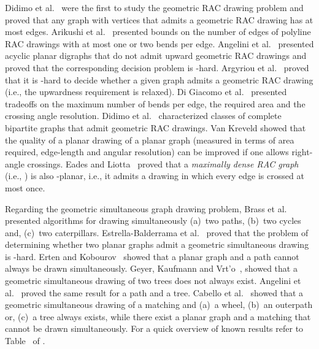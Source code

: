 \documentclass{llncs}
\begin{document}
Didimo et al.\ \cite{DEL09} were the first to study the geometric
RAC drawing problem and proved that any graph with 
vertices that admits a geometric RAC drawing has at most 
edges. Arikushi et al.\ \cite{AFKMT10} presented bounds on the
number of edges of polyline RAC drawings with at most one or two
bends per edge. Angelini et al.\ \cite{ACBDFKS09} presented acyclic
planar digraphs that do not admit upward geometric RAC drawings and
proved that the corresponding decision problem is -hard.
Argyriou et al.\ \cite{ABS11} proved that it is -hard to decide
whether a given graph admits a geometric RAC drawing (i.e., the
upwardness requirement is relaxed). Di Giacomo et al.\
\cite{DGDLM10} presented tradeoffs on the maximum number of bends
per edge, the required area and the crossing angle resolution.
Didimo et al.\ \cite{DEL10} characterized classes of complete
bipartite graphs that admit geometric RAC drawings. Van Kreveld
\cite{vK10} showed that the quality of a planar drawing of a planar
graph (measured in terms of area required, edge-length and angular
resolution) can be improved if one allows right-angle crossings.
Eades and Liotta\ \cite{EL11} proved that a \emph{maximally dense
RAC graph} (i.e., ) is also -planar, i.e., it admits
a drawing in which every edge is crossed at most once.

Regarding the geometric simultaneous graph drawing problem, Brass et
al.\ \cite{BCDE07} presented algorithms for drawing simultaneously
(a)~two paths, (b)~two cycles and, (c)~two caterpillars.
Estrella-Balderrama et al.\ \cite{EGJPSS07}
proved that the problem of determining whether two planar graphs
admit a geometric simultaneous drawing is -hard. Erten and
Kobourov\ \cite{EK05} showed that a planar graph and a path cannot
always be drawn simultaneously.
Geyer,
Kaufmann and Vrt'o\ \cite{GKV09}, showed that a geometric
simultaneous drawing of two trees does not always exist. Angelini et
al.\ \cite{AGKN10} proved the same result for a path and a tree.
Cabello et al.\ \cite{CvKLMSV11} showed that a geometric
simultaneous drawing of a matching and (a)~a wheel, (b)~an outerpath
or, (c)~a tree always exists, while there exist a planar graph and a
matching that cannot be drawn simultaneously. For a quick overview
of known results
refer to Table~ of
\cite{FKK09}.
\end{document}
